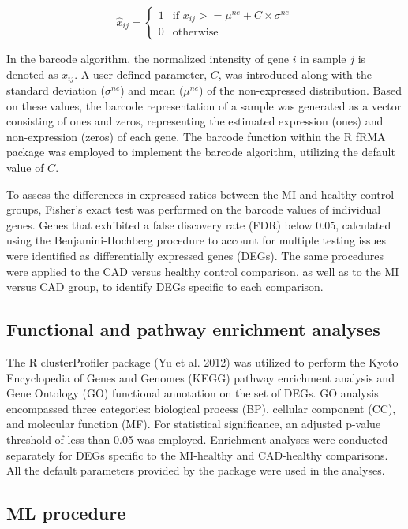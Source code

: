 \documentclass[
]{article}
\begin{document}
\[
\hat{x}_{ij} = \left\{
  \begin{array}{ll}
    1 & \mbox{if } x_{ij} >= \mu^{ne} + C \times \sigma^{ne} \\
    0 & \mbox{otherwise}
  \end{array}
\right.
\]

In the barcode algorithm, the normalized intensity of gene \(i\) in
sample \(j\) is denoted as \(x_{ij}\). A user-defined parameter, \(C\),
was introduced along with the standard deviation (\(\sigma^{ne}\)) and
mean (\(\mu^{ne}\)) of the non-expressed distribution. Based on these
values, the barcode representation of a sample was generated as a vector
consisting of ones and zeros, representing the estimated expression
(ones) and non-expression (zeros) of each gene. The barcode function
within the R fRMA package was employed to implement the barcode
algorithm, utilizing the default value of \(C\).

To assess the differences in expressed ratios between the MI and healthy
control groups, Fisher's exact test was performed on the barcode values
of individual genes. Genes that exhibited a false discovery rate (FDR)
below \(0.05\), calculated using the Benjamini-Hochberg procedure to
account for multiple testing issues were identified as differentially
expressed genes (DEGs). The same procedures were applied to the CAD
versus healthy control comparison, as well as to the MI versus CAD
group, to identify DEGs specific to each comparison.

\hypertarget{functional-and-pathway-enrichment-analyses}{%
\subsection{Functional and pathway enrichment
analyses}\label{functional-and-pathway-enrichment-analyses}}

The R clusterProfiler package (Yu et al. 2012) was utilized to perform
the Kyoto Encyclopedia of Genes and Genomes (KEGG) pathway enrichment
analysis and Gene Ontology (GO) functional annotation on the set of
DEGs. GO analysis encompassed three categories: biological process (BP),
cellular component (CC), and molecular function (MF). For statistical
significance, an adjusted p-value threshold of less than 0.05 was
employed. Enrichment analyses were conducted separately for DEGs
specific to the MI-healthy and CAD-healthy comparisons. All the default
parameters provided by the package were used in the analyses.

\hypertarget{ml-procedure}{%
\subsection{ML procedure}\label{ml-procedure}}
\end{document}
